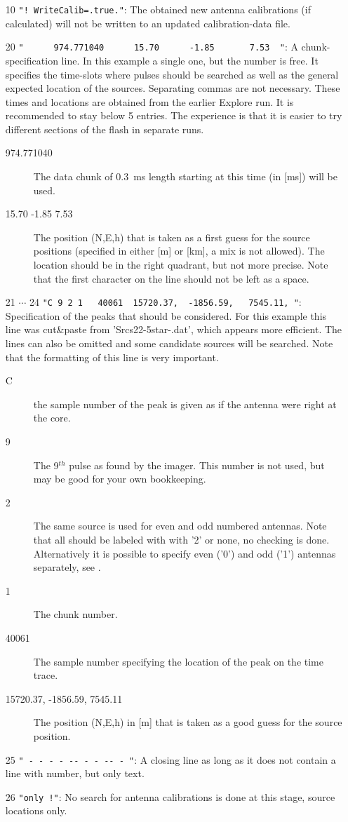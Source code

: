 \begin{enumerate}
\item[10] \verb#"! WriteCalib=.true."#: The obtained new antenna calibrations (if calculated) will not be written to an updated calibration-data file.
\item[20] \verb#"      974.771040      15.70      -1.85       7.53  "#: A chunk-specification line. In this example a single one, but the number is free. It specifies the time-slots where pulses should be searched as well as the general expected location of the sources. Separating commas are not necessary. These times and locations are obtained from the earlier Explore run. It is recommended to stay below 5 entries. The experience is that it is easier to try different sections of the flash in separate runs.
    \begin{description}
    \item[974.771040] The data chunk of 0.3~ms length starting at this time (in [ms]) will be used.
    \item[15.70      -1.85       7.53] The position (N,E,h)  that is taken as a first guess for the source positions (specified in either [m] or [km], a mix is not allowed). The location should be in the right quadrant, but not more precise. Note that the first character on the line should not be left as a space.
    \end{description}
\item[21 $\cdots$ 24] \verb#"C 9 2 1   40061  15720.37,  -1856.59,   7545.11, "#: Specification of the peaks that should be considered. For this example this line was cut\&paste from 'Srcs22-5star-.dat', which appears more efficient. The lines can also be omitted and some candidate sources will be searched. Note that the formatting of this line is very important.
    \begin{description}
    \item[C] the sample number of the peak is given as if the antenna were right at the core.
    \item[ 9] The 9$^{th}$ pulse as found by the imager. This number is not used, but may be good for your own bookkeeping.
    \item[ 2] The same source is used for even and odd numbered antennas. Note that all should be labeled with with '2' or none, no checking is done. Alternatively it is possible to specify even ('0') and odd ('1') antennas separately, see .
    \item[ 1] The chunk number.
    \item[ 40061] The sample number specifying the location of the peak on the time trace.
    \item[15720.37,  -1856.59,   7545.11] The position (N,E,h) in [m] that is taken as a good guess for the source position.
    \end{description}
\item[25] \verb#" - - - - -- - - -- - "#: A closing line as long as it does not contain a line with number, but only text.
\item[26] \verb#"only !"#: No search for antenna calibrations is done at this stage, source locations only.
\end{enumerate}

